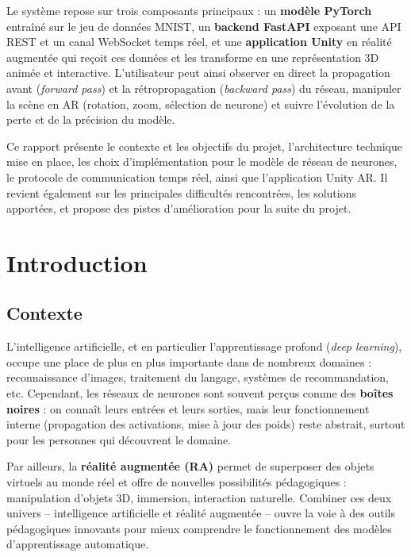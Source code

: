 \documentclass[12pt,a4paper]{report}
\begin{document}
Le syst\`eme repose sur trois composants principaux : un \textbf{mod\`ele
PyTorch} entra\^in\'e sur le jeu de donn\'ees MNIST, un \textbf{backend
FastAPI} exposant une API REST et un canal WebSocket temps r\'eel, et une
\textbf{application Unity} en r\'ealit\'e augment\'ee qui re\c{c}oit ces
donn\'ees et les transforme en une repr\'esentation 3D anim\'ee et
interactive. L'utilisateur peut ainsi observer en direct la propagation
avant (\textit{forward pass}) et la r\'etropropagation (\textit{backward
pass}) du r\'eseau, manipuler la sc\`ene en AR (rotation, zoom, s\'election
de neurone) et suivre l'\'evolution de la perte et de la pr\'ecision du
mod\`ele.

Ce rapport pr\'esente le contexte et les objectifs du projet, l'architecture
technique mise en place, les choix d'impl\'ementation pour le mod\`ele de
r\'eseau de neurones, le protocole de communication temps r\'eel, ainsi que
l'application Unity AR. Il revient \'egalement sur les principales
difficult\'es rencontr\'ees, les solutions apport\'ees, et propose des pistes
d'am\'elioration pour la suite du projet.

\tableofcontents

\chapter{Introduction}

\section{Contexte}

L'intelligence artificielle, et en particulier l'apprentissage profond
(\textit{deep learning}), occupe une place de plus en plus importante dans
de nombreux domaines : reconnaissance d'images, traitement du langage,
syst\`emes de recommandation, etc. Cependant, les r\'eseaux de neurones sont
souvent per\c{c}us comme des \textbf{bo\^ites noires} : on conna\^it leurs
entr\'ees et leurs sorties, mais leur fonctionnement interne (propagation des
activations, mise \`a jour des poids) reste abstrait, surtout pour les
personnes qui d\'ecouvrent le domaine.

Par ailleurs, la \textbf{r\'ealit\'e augment\'ee (RA)} permet de superposer
des objets virtuels au monde r\'eel et offre de nouvelles possibilit\'es
p\'edagogiques : manipulation d'objets 3D, immersion, interaction naturelle.
Combiner ces deux univers -- intelligence artificielle et r\'ealit\'e
augment\'ee -- ouvre la voie \`a des outils p\'edagogiques innovants pour
mieux comprendre le fonctionnement des mod\`eles d'apprentissage automatique.
\end{document}
